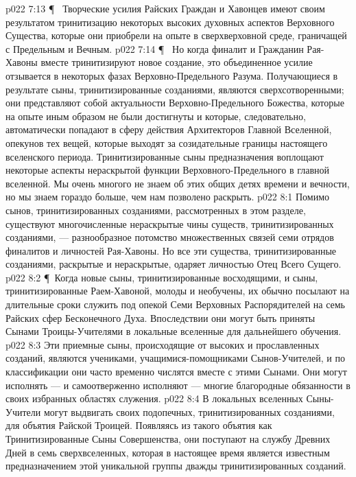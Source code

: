 \vs p022 7:13 \P\ \bibnobreakspace {} Творческие усилия Райских Граждан и Хавонцев имеют своим результатом тринитизацию некоторых высоких духовных аспектов Верховного Существа, которые они приобрели на опыте в сверхверховной среде, граничащей с Предельным и Вечным.
\vs p022 7:14 \P\ \bibnobreakspace {} Но когда финалит и Гражданин Рая\hyp{}Хавоны вместе тринитизируют новое создание, это объединенное усилие отзывается в некоторых фазах Верховно\hyp{}Предельного Разума. Получающиеся в результате сыны, тринитизированные созданиями, являются сверхсотворенными; они представляют собой актуальности Верховно\hyp{}Предельного Божества, которые на опыте иным образом не были достигнуты и которые, следовательно, автоматически попадают в сферу действия Архитекторов Главной Вселенной, опекунов тех вещей, которые выходят за созидательные границы настоящего вселенского периода. Тринитизированные сыны предназначения воплощают некоторые аспекты нераскрытой функции Верховного\hyp{}Предельного в главной вселенной. Мы очень многого не знаем об этих общих детях времени и вечности, но мы знаем гораздо больше, чем нам позволено раскрыть.
\vs p022 8:1 Помимо сынов, тринитизированных созданиями, рассмотренных в этом разделе, существуют многочисленные нераскрытые чины существ, тринитизированных созданиями, --- разнообразное потомство множественных связей семи отрядов финалитов и личностей Рая\hyp{}Хавоны. Но все эти существа, тринитизированные созданиями, раскрытые и нераскрытые, одаряет личностью Отец Всего Сущего.
\vs p022 8:2 \P\ Когда новые сыны, тринитизированные восходящими, и сыны, тринитизированные Раем\hyp{}Хавоной, молоды и необучены, их обычно посылают на длительные сроки служить под опекой Семи Верховных Распорядителей на семь Райских сфер Бесконечного Духа. Впоследствии они могут быть приняты Сынами Троицы\hyp{}Учителями в локальные вселенные для дальнейшего обучения.
\vs p022 8:3 Эти приемные сыны, происходящие от высоких и прославленных созданий, являются учениками, учащимися\hyp{}помощниками Сынов\hyp{}Учителей, и по классификации они часто временно числятся вместе с этими Сынами. Они могут исполнять --- и самоотверженно исполняют --- многие благородные обязанности в своих избранных областях служения.
\vs p022 8:4 В локальных вселенных Сыны\hyp{}Учители могут выдвигать своих подопечных, тринитизированных созданиями, для объятия Райской Троицей. Появляясь из такого объятия как Тринитизированные Сыны Совершенства, они поступают на службу Древних Дней в семь сверхвселенных, которая в настоящее время является известным предназначением этой уникальной группы дважды тринитизированных созданий.
